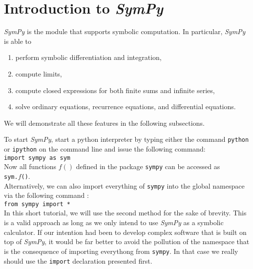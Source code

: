 \documentclass{report}
\begin{document}
\chapter{Introduction to \textsl{SymPy}}
\textsl{SymPy} is the module that supports symbolic computation.  In particular, \textsl{SymPy} is able to
\begin{enumerate}
\item perform symbolic differentiation and integration,
\item compute limits,
\item compute closed expressions for both finite sums and infinite  series,
\item solve ordinary equations, recurrence equations, and differential equations.
\end{enumerate}
We will demonstrate all these features in the following subsections.

To start \textsl{SymPy}, start a python interpreter by typing either the command \texttt{python} or \texttt{ipython} 
on the command line and issue the following command:
\\[0.2cm]
\hspace*{1.3cm}
\texttt{import sympy as sym}
\\[0.2cm]
Now all functions $f()$ defined in the package \texttt{sympy} can be accessed as
\\[0.2cm]
\hspace*{1.3cm}
\texttt{sym.$f$()}.
\\[0.2cm]
Alternatively, we can also import everything of \texttt{sympy} into the global namespace via the
following command :
\\[0.2cm]
\hspace*{1.3cm}
\texttt{from sympy import *}
\\[0.2cm]
In this short tutorial, we will use the second method for the sake of brevity.  This is a valid
approach as long as we only intend to use \textsl{SymPy} as a symbolic calculator.  If our intention
had been to develop complex software that is built on top of \textsl{SymPy}, it would be far better
to avoid the pollution of the namespace that is the consequence of importing everythong from
\texttt{sympy}.  In that case we really should use the \texttt{import} declaration presented first.
\end{document}
